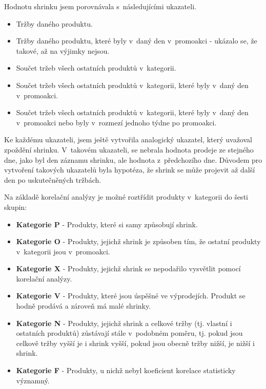 Hodnotu shrinku jsem porovnávala s~následujícími ukazateli. 
\begin{itemize}
    \itemsep0em 
    \item Tržby daného produktu.
    \item Tržby daného produktu, které byly v~daný den v~promoakci - ukázalo se, že takové, až na výjimky nejsou.
    \item Součet tržeb všech ostatních produktů v~kategorii.
    \item Součet tržeb všech ostatních produktů v~kategorii, které byly v~daný den v~promoakci.
    \item Součet tržeb všech ostatních produktů v~kategorii, které byly v~daný den v~promoakci nebo byly v~rozmezí jednoho týdne po promoakci.
\end{itemize}

Ke každému ukazateli, jsem ještě vytvořila analogický ukazatel, který uvažoval zpoždění shrinku. V~takovém ukazateli, se nebrala hodnota prodeje ze stejného dne, jako byl den záznamu shrinku, ale hodnota z~předchozího dne. Důvodem pro vytvoření takových ukazatelů byla hypotéza, že shrink se může projevit až další den po uskutečněných tržbách. 

Na základě korelační analýzy je možné roztřídit produkty v~kategorii do šesti skupin:
\begin{itemize}
    \itemsep0em 
    \item[] \textbf{Kategorie P} - Produkty, které si samy způsobují shrink.
    \item[] \textbf{Kategorie O} - Produkty, jejichž shrink je způsoben tím, že ostatní produkty v~kategorii jsou v~promoakci.
    \item[] \textbf{Kategorie X} - Produkty, jejichž shrink se nepodařilo vysvětlit pomocí korelační analýzy.
    \item[] \textbf{Kategorie V} - Produkty, které jsou úspěšné ve výprodejích. Produkt se hodně prodává a zároveň má malé shrinky.
    \item[] \textbf{Kategorie N} - Produkty, jejichž shrink a celkové tržby (tj. vlastní i ostatních produktů) zůstávají stále v~podobném poměru, tj. pokud jsou celkově tržby vyšší je i shrink vyšší, pokud jsou obecně tržby nižší, je nižší i shrink.
    \item[] \textbf{Kategorie F} - Produkty, u nichž nebyl koeficient korelace statisticky významný.
\end{itemize}

